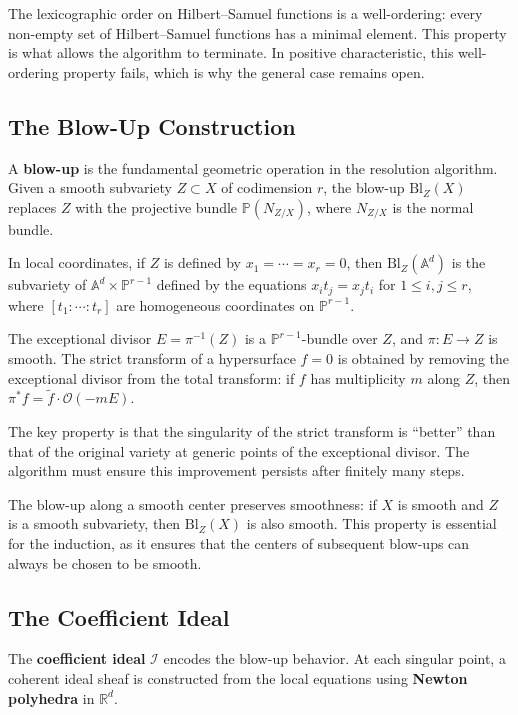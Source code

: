 The lexicographic order on Hilbert--Samuel functions is a well-ordering: every non-empty set of Hilbert--Samuel functions has a minimal element. This property is what allows the algorithm to terminate. In positive characteristic, this well-ordering property fails, which is why the general case remains open.

\subsection*{The Blow-Up Construction}

A \textbf{blow-up} is the fundamental geometric operation in the resolution algorithm. Given a smooth subvariety $Z \subset X$ of codimension $r$, the blow-up $\text{Bl}_Z(X)$ replaces $Z$ with the projective bundle $\mathbb{P}(N_{Z/X})$, where $N_{Z/X}$ is the normal bundle.

In local coordinates, if $Z$ is defined by $x_1 = \cdots = x_r = 0$, then $\text{Bl}_Z(\mathbb{A}^d)$ is the subvariety of $\mathbb{A}^d \times \mathbb{P}^{r-1}$ defined by the equations $x_i t_j = x_j t_i$ for $1 \leq i, j \leq r$, where $[t_1 : \cdots : t_r]$ are homogeneous coordinates on $\mathbb{P}^{r-1}$.

The exceptional divisor $E = \pi^{-1}(Z)$ is a $\mathbb{P}^{r-1}$-bundle over $Z$, and $\pi: E \to Z$ is smooth. The strict transform of a hypersurface $f = 0$ is obtained by removing the exceptional divisor from the total transform: if $f$ has multiplicity $m$ along $Z$, then $\pi^*f = \tilde{f} \cdot \mathcal{O}(-mE)$.

The key property is that the singularity of the strict transform is ``better'' than that of the original variety at generic points of the exceptional divisor. The algorithm must ensure this improvement persists after finitely many steps.

The blow-up along a smooth center preserves smoothness: if $X$ is smooth and $Z$ is a smooth subvariety, then $\text{Bl}_Z(X)$ is also smooth. This property is essential for the induction, as it ensures that the centers of subsequent blow-ups can always be chosen to be smooth.

\subsection*{The Coefficient Ideal}

The \textbf{coefficient ideal} $\mathcal{I}$ encodes the blow-up behavior. At each singular point, a coherent ideal sheaf is constructed from the local equations using \textbf{Newton polyhedra} in $\mathbb{R}^d$.


